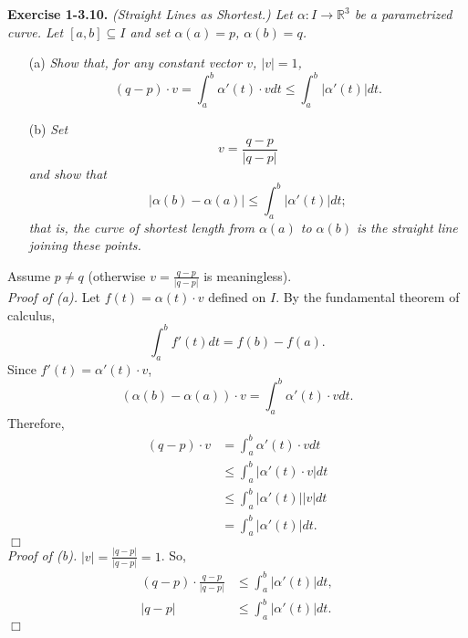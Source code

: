 \documentclass{article}
\begin{document}



\textbf{Exercise 1-3.10.}
\emph{(Straight Lines as Shortest.)
Let $\alpha: I \to \mathbb{R}^3$ be a parametrized curve.
Let $[a,b] \subseteq I$ and set $\alpha(a) = p$, $\alpha(b) = q$.}
\begin{enumerate}
  \item[(a)]
  \emph{Show that, for any constant vector $v$, $|v| = 1$,
  $$(q-p) \cdot v
  = \int_{a}^{b} \alpha'(t) \cdot v dt
  \leq \int_{a}^{b} |\alpha'(t)| dt.$$}
  \item[(b)]
  \emph{Set
  $$v = \frac{q-p}{|q-p|}$$
  and show that
  $$|\alpha(b) - \alpha(a)| \leq \int_{a}^{b} |\alpha'(t)| dt;$$
  that is, the curve of shortest length from
  $\alpha(a)$ to $\alpha(b)$ is the straight line
  joining these points.} \\
\end{enumerate}

Assume $p \neq q$ (otherwise $v = \frac{q-p}{|q-p|}$ is meaningless). \\

\emph{Proof of (a).}
Let $f(t) = \alpha(t) \cdot v$ defined on $I$.
By the fundamental theorem of calculus,
$$\int_{a}^{b} f'(t) dt = f(b) - f(a).$$
Since $f'(t) = \alpha'(t) \cdot v$,
$$(\alpha(b) - \alpha(a)) \cdot v = \int_{a}^{b} \alpha'(t) \cdot v dt.$$
Therefore,
\begin{align*}
(q - p) \cdot v
&= \int_{a}^{b} \alpha'(t) \cdot v dt \\
&\leq \int_{a}^{b} |\alpha'(t) \cdot v| dt \\
&\leq \int_{a}^{b} |\alpha'(t)||v| dt \\
&= \int_{a}^{b} |\alpha'(t)| dt.
\end{align*}
$\Box$ \\

\emph{Proof of (b).}
$|v| = \frac{|q-p|}{|q-p|} = 1$.
So,
\begin{align*}
(q-p) \cdot \frac{q-p}{|q-p|}
&\leq \int_{a}^{b} |\alpha'(t)| dt, \\
|q-p|
&\leq \int_{a}^{b} |\alpha'(t)| dt.
\end{align*}
$\Box$ \\\\



\end{document}
